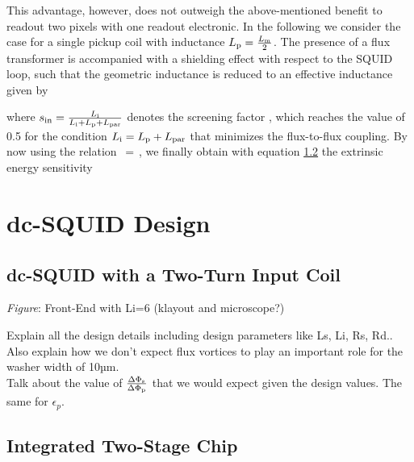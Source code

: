 
This advantage, however, does not outweigh the above-mentioned benefit to readout two pixels with one readout electronic. In the following we consider the case for a single pickup coil with inductance $L_{\rm p}=\frac{L_{\rm m}}{2}$. The presence of a flux transformer is accompanied with a shielding effect with respect to the SQUID loop, such that the geometric inductance is reduced to an effective inductance given by \cite{Gross2016} 


where $s_{\rm in}=\frac{L_{\rm i}}{L_{\rm i} + L_{\rm p} + L_{\rm par}}$ denotes the screening factor \cite{Clarke2004}, which reaches the value of 0.5 for the condition $L_{\rm i}=L_{\rm p}+L_{\rm par}$ that minimizes the flux-to-flux coupling. By now using the relation $\frac{}{}=\frac{}{}$, we finally obtain with equation \ref{} the extrinsic energy sensitivity 


\section{dc-SQUID Design} \label{sec_SQUIDdesign}


\subsection{dc-SQUID with a Two-Turn Input Coil}

\textit{Figure}: Front-End with Li=6 (klayout and microscope?)

Explain all the design details including design parameters like Ls, Li, Rs, Rd.. \\
Also explain how we don't expect flux vortices to play an important role for the washer width of 10µm.\\
Talk about the value of $\frac{\Delta\Phi_{\rm s}}{\Delta\Phi_{\rm p}}$ that we would expect given the design values. The same for $\epsilon_p$.

\subsection{Integrated Two-Stage Chip}

